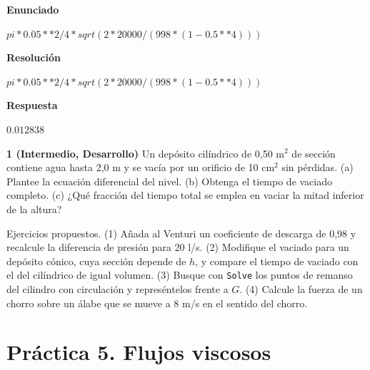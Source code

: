 \documentclass[10pt,openany]{book}
\begin{document}
\begin{tcolorbox}[title={Problema resuelto}, studiumworked, breakable]

\noindent\textbf{Enunciado}

\(pi*0.05**2/4*sqrt(2*20000/(998*(1 - 0.5**4)))\)

\noindent\textbf{Resolución}

\(pi*0.05**2/4*sqrt(2*20000/(998*(1 - 0.5**4)))\)

\noindent\textbf{Respuesta}

\(0.012838\)
\end{tcolorbox}

\begin{tcolorbox}[title={Ejercicios propuestos}, studiumworked, breakable]

\noindent\textbf{1 (Intermedio, Desarrollo)}
Un depósito cilíndrico de 0,50 m\(^2\) de sección contiene agua hasta 2,0 m y se vacía por un orificio de 10 cm\(^2\) sin pérdidas. (a) Plantee la ecuación diferencial del nivel. (b) Obtenga el tiempo de vaciado completo. (c) ¿Qué fracción del tiempo total se emplea en vaciar la mitad inferior de la altura?
\end{tcolorbox}

\begin{tcolorbox}[title={Autoevaluación}, studiumcheck, breakable]

Ejercicios propuestos. (1) Añada al Venturi un coeficiente de descarga de 0,98 y recalcule la diferencia de presión para 20 l/s. (2) Modifique el vaciado para un depósito cónico, cuya sección depende de \(h\), y compare el tiempo de vaciado con el del cilíndrico de igual volumen. (3) Busque con \texttt{Solve} los puntos de remanso del cilindro con circulación y represéntelos frente a \(G\). (4) Calcule la fuerza de un chorro sobre un álabe que se mueve a 8 m/s en el sentido del chorro.
\end{tcolorbox}
\studiumchaptercheck

\chapter{Práctica 5. Flujos viscosos}
\label{chap:m05}

\end{document}

